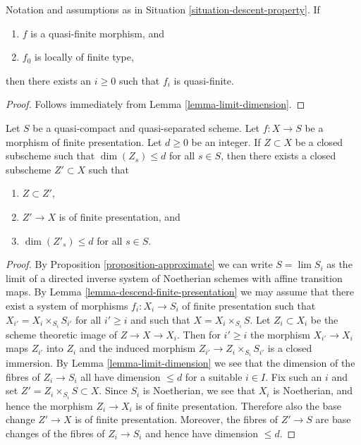 \begin{lemma}
\label{lemma-descend-quasi-finite}
Notation and assumptions as in Situation \ref{situation-descent-property}.
If
\begin{enumerate}
\item $f$ is a quasi-finite morphism, and
\item $f_0$ is locally of finite type,
\end{enumerate}
then there exists an $i \geq 0$ such that $f_i$ is quasi-finite.
\end{lemma}

\begin{proof}
Follows immediately from Lemma \ref{lemma-limit-dimension}.
\end{proof}

\begin{lemma}
\label{lemma-approximate-given-relative-dimension}
Let $S$ be a quasi-compact and quasi-separated scheme.
Let $f : X \to S$ be a morphism of finite presentation.
Let $d \geq 0$ be an integer.
If $Z \subset X$ be a closed subscheme such that
$\dim(Z_s) \leq d$ for all $s \in S$, then there exists a
closed subscheme $Z' \subset X$ such that
\begin{enumerate}
\item $Z \subset Z'$,
\item $Z' \to X$ is of finite presentation, and
\item $\dim(Z'_s) \leq d$ for all $s \in S$.
\end{enumerate}
\end{lemma}

\begin{proof}
By
Proposition \ref{proposition-approximate}
we can write $S = \lim S_i$ as the limit of a directed inverse
system of Noetherian schemes with affine transition maps. By
Lemma \ref{lemma-descend-finite-presentation}
we may assume that there exist a system of morphisms
$f_i : X_i \to S_i$ of finite presentation such that
$X_{i'} = X_i \times_{S_i} S_{i'}$
for all $i' \geq i$ and such that $X = X_i \times_{S_i} S$.
Let $Z_i \subset X_i$ be the scheme theoretic image of
$Z \to X \to X_i$. Then for $i' \geq i$ the morphism $X_{i'} \to X_i$
maps $Z_{i'}$ into $Z_i$ and the induced morphism
$Z_{i'} \to Z_i \times_{S_i} S_{i'}$ is a closed immersion. By
Lemma \ref{lemma-limit-dimension}
we see that the dimension of the fibres of $Z_i \to S_i$
all have dimension $\leq d$ for a suitable $i \in I$.
Fix such an $i$ and set $Z' = Z_i \times_{S_i} S \subset X$.
Since $S_i$ is Noetherian, we see that $X_i$ is Noetherian, and hence
the morphism $Z_i \to X_i$ is of finite presentation.
Therefore also the base change $Z' \to X$ is of finite presentation.
Moreover, the fibres of $Z' \to S$ are base changes of the fibres
of $Z_i \to S_i$ and hence have dimension $\leq d$.
\end{proof}






